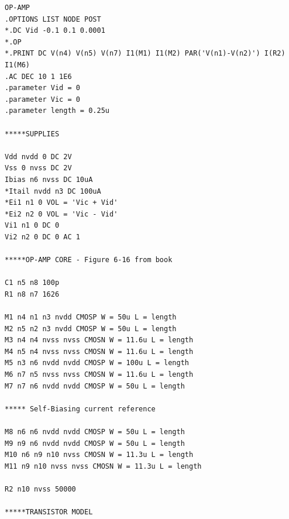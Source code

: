 \documentclass[12pt]{article}
\begin{document}
\begin{lstlisting}
OP-AMP
.OPTIONS LIST NODE POST
*.DC Vid -0.1 0.1 0.0001
*.OP
*.PRINT DC V(n4) V(n5) V(n7) I1(M1) I1(M2) PAR('V(n1)-V(n2)') I(R2) I1(M6)
.AC DEC 10 1 1E6
.parameter Vid = 0
.parameter Vic = 0
.parameter length = 0.25u

*****SUPPLIES

Vdd nvdd 0 DC 2V
Vss 0 nvss DC 2V
Ibias n6 nvss DC 10uA
*Itail nvdd n3 DC 100uA
*Ei1 n1 0 VOL = 'Vic + Vid'
*Ei2 n2 0 VOL = 'Vic - Vid'
Vi1 n1 0 DC 0
Vi2 n2 0 DC 0 AC 1

*****OP-AMP CORE - Figure 6-16 from book

C1 n5 n8 100p
R1 n8 n7 1626

M1 n4 n1 n3 nvdd CMOSP W = 50u L = length
M2 n5 n2 n3 nvdd CMOSP W = 50u L = length
M3 n4 n4 nvss nvss CMOSN W = 11.6u L = length
M4 n5 n4 nvss nvss CMOSN W = 11.6u L = length
M5 n3 n6 nvdd nvdd CMOSP W = 100u L = length
M6 n7 n5 nvss nvss CMOSN W = 11.6u L = length
M7 n7 n6 nvdd nvdd CMOSP W = 50u L = length

***** Self-Biasing current reference

M8 n6 n6 nvdd nvdd CMOSP W = 50u L = length
M9 n9 n6 nvdd nvdd CMOSP W = 50u L = length
M10 n6 n9 n10 nvss CMOSN W = 11.3u L = length
M11 n9 n10 nvss nvss CMOSN W = 11.3u L = length

R2 n10 nvss 50000

*****TRANSISTOR MODEL


\end{lstlisting}
\end{document}
